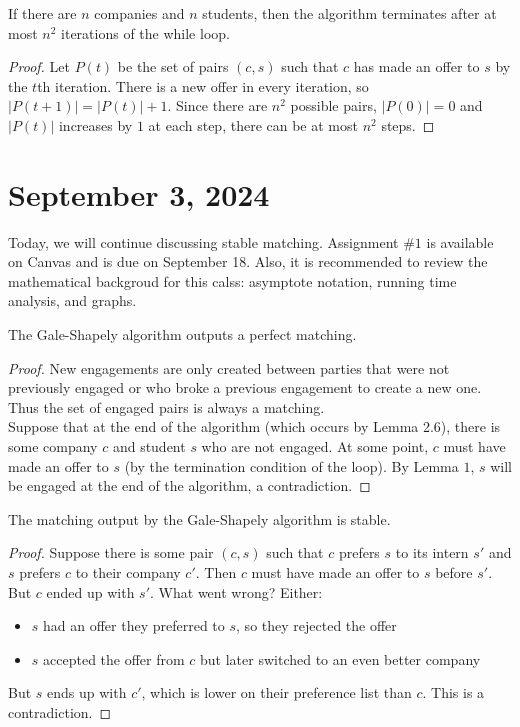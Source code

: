 \documentclass[12pt]{scrartcl}
\begin{document}
\begin{lemma}
    If there are $n$ companies and $n$ students, then the algorithm terminates after at most $n^2$ iterations of the while loop.
\end{lemma}

\begin{proof}
    Let $P(t)$ be the set of pairs $(c, s)$ such that $c$ has made an offer to $s$ by the $t$th iteration. There is a new offer in every iteration, so $|P(t+1)| = |P(t)| + 1$. Since there are $n^2$ possible pairs, $|P(0)| = 0$ and $|P(t)|$ increases by $1$ at each step, there can be at most $n^2$ steps.
\end{proof}

\section{September 3, 2024}
Today, we will continue discussing stable matching. Assignment $\# 1$ is available on Canvas and is due on September 18. Also, it is recommended to review the mathematical backgroud for this calss: asymptote notation, running time analysis, and graphs.

\begin{lemma}
    The Gale-Shapely algorithm outputs a perfect matching.
\end{lemma}

\begin{proof}
    New engagements are only created between parties that were not previously engaged or who broke a previous engagement to create a new one. Thus the set of engaged pairs is always a matching. \\

    Suppose that at the end of the algorithm (which occurs by Lemma 2.6), there is some company $c$ and student $s$ who are not engaged. At some point, $c$ must have made an offer to $s$ (by the termination condition of the loop). By Lemma $1$, $s$ will be engaged at the end of the algorithm, a contradiction.
\end{proof}

\begin{theorem}
    The matching output by the Gale-Shapely algorithm is stable.
\end{theorem}

\begin{proof}
    Suppose there is some pair $(c, s)$ such that $c$ prefers $s$ to its intern $s'$ and $s$ prefers $c$ to their company $c'$. Then $c$ must have made an offer to $s$ before $s'$. But $c$ ended up with $s'$. What went wrong? Either:
        \begin{itemize}
            \item $s$ had an offer they preferred to $s$, so they rejected the offer
            \item $s$ accepted the offer from $c$ but later switched to an even better company
        \end{itemize}
    But $s$ ends up with $c'$, which is lower on their preference list than $c$. This is a contradiction.
\end{proof}
\end{document}
